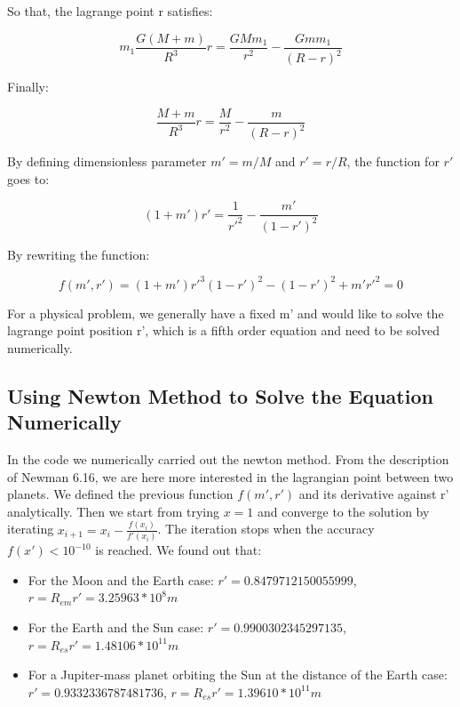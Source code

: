 \documentclass[letterpaper,12pt]{article}
\begin{document}
So that, the lagrange point r satisfies:

\begin{equation}
    m_1\frac{G(M+m)}{R^3}r = \frac{GMm_1}{r^2} - \frac{Gmm_1}{(R-r)^2}
\end{equation}

Finally:

\begin{equation}
    \frac{M+m}{R^3}r = \frac{M}{r^2} - \frac{m}{(R-r)^2}
\end{equation}

By defining dimensionless parameter $m' = m/M$ and $r' = r/R$, the function for $r'$ goes to:

\begin{equation}
    (1+m')r' = \frac{1}{r'^2} - \frac{m'}{(1-r')^2}
\end{equation}

By rewriting the function:

\begin{equation}
    f(m',r') = (1+m')r'^3 (1-r')^2 - (1-r')^2 + m' r'^2 = 0
\end{equation}

For a physical problem, we generally have a fixed m' and would like to solve the lagrange point position r', which is a fifth order equation and need to be solved numerically.

\subsection{Using Newton Method to Solve the Equation Numerically}

In the code we numerically carried out the newton method. From the description of Newman 6.16, we are here more interested in the lagrangian point between two planets. We defined the previous function $f(m',r')$ and its derivative against r' analytically. Then we start from trying $x = 1$ and converge to the solution by iterating $x_{i+1} = x_i - \frac{f(x_i)}{f'(x_i)}$. The iteration stops when the accuracy $f(x') < 10^{-10}$ is reached. We found out that:

\begin{itemize}
    \item For the Moon and the Earth case: $r' = 0.8479712150055999$, $r = R_{em}r' = 3.25963 * 10^8 m$
    \item For the Earth and the Sun case: $r' = 0.9900302345297135$, $r = R_{es}r' = 1.48106 * 10^{11} m$
    \item For a Jupiter-mass planet orbiting the Sun at the distance of the Earth case: $r' = 0.9332336787481736$, $r = R_{es}r' = 1.39610 * 10^{11} m$
\end{itemize}
\end{document}
